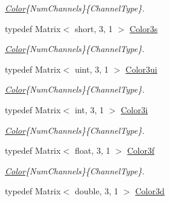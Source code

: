 \begin{DoxyCompactItemize}
\begin{DoxyCompactList}\small\item\em \hyperlink{class_d_o_1_1_color}{Color}\{Num\-Channels\}\{Channel\-Type\}. \end{DoxyCompactList}\item 
\hypertarget{group___color_types_gabd8ed6efb783441fd8fb924a32c6848b}{typedef Matrix$<$ short, 3, 1 $>$ \hyperlink{group___color_types_gabd8ed6efb783441fd8fb924a32c6848b}{Color3s}}\label{group___color_types_gabd8ed6efb783441fd8fb924a32c6848b}

\begin{DoxyCompactList}\small\item\em \hyperlink{class_d_o_1_1_color}{Color}\{Num\-Channels\}\{Channel\-Type\}. \end{DoxyCompactList}\item 
\hypertarget{group___color_types_ga7b8b491888795ce0cd0a75d017db1a74}{typedef Matrix$<$ uint, 3, 1 $>$ \hyperlink{group___color_types_ga7b8b491888795ce0cd0a75d017db1a74}{Color3ui}}\label{group___color_types_ga7b8b491888795ce0cd0a75d017db1a74}

\begin{DoxyCompactList}\small\item\em \hyperlink{class_d_o_1_1_color}{Color}\{Num\-Channels\}\{Channel\-Type\}. \end{DoxyCompactList}\item 
\hypertarget{group___color_types_gabe1176859fd849a93edd59c687680805}{typedef Matrix$<$ int, 3, 1 $>$ \hyperlink{group___color_types_gabe1176859fd849a93edd59c687680805}{Color3i}}\label{group___color_types_gabe1176859fd849a93edd59c687680805}

\begin{DoxyCompactList}\small\item\em \hyperlink{class_d_o_1_1_color}{Color}\{Num\-Channels\}\{Channel\-Type\}. \end{DoxyCompactList}\item 
\hypertarget{group___color_types_ga4df0906a5f67901886b7d42343632ccb}{typedef Matrix$<$ float, 3, 1 $>$ \hyperlink{group___color_types_ga4df0906a5f67901886b7d42343632ccb}{Color3f}}\label{group___color_types_ga4df0906a5f67901886b7d42343632ccb}

\begin{DoxyCompactList}\small\item\em \hyperlink{class_d_o_1_1_color}{Color}\{Num\-Channels\}\{Channel\-Type\}. \end{DoxyCompactList}\item 
\hypertarget{group___color_types_gacc3541259f2a9e5b3d0315837435bac1}{typedef Matrix$<$ double, 3, 1 $>$ \hyperlink{group___color_types_gacc3541259f2a9e5b3d0315837435bac1}{Color3d}}\label{group___color_types_gacc3541259f2a9e5b3d0315837435bac1}


\end{DoxyCompactItemize}
